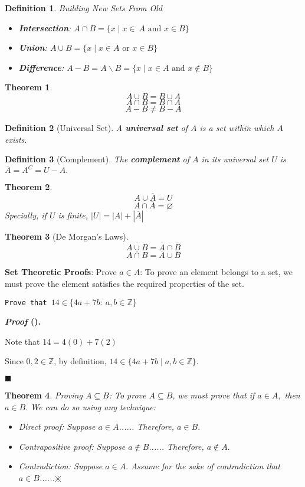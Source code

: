\documentclass[12pt,a4paper]{article}
\newtheorem{thm}{Theorem}[subsection]
\newtheorem{df}{Definition}[subsection]
\newcounter{nprf}[subsection]
\newenvironment*{prf}{\par\indent\textbf{\textit{Proof} (\stepcounter{nprf}\thenprf). }\par}{\par\hfill $\blacksquare$\par}
\def\Z{{\mathbb{Z}}}
\def\emptyset{\varnothing}
\begin{document}
\begin{df}
	Building New Sets From Old
	\begin{itemize}
		\item \textbf{Intersection}: $A\cap B=\{x\mid x\in\ A\text{ and }x\in B\}$
		\item \textbf{Union}: $A\cup B=\{x\mid x\in A\text{ or }x\in B\}$
		\item \textbf{Difference}: $A-B=A\backslash B=\{x\mid x\in A\text{ and }x\notin B\}$
	\end{itemize}
\end{df}
\begin{thm}
	\[A\cup B=B\cup A\]	
	\[A\cap B=B\cap A\]
	\[A-B\neq B-A\]
\end{thm}
\begin{df}[Universal Set]
	A \textbf{universal set} of $A$ is a set within which $A$ exists.	
\end{df}
\begin{df}[Complement]
	The \textbf{complement} of $A$ in its universal set $U$ is $\overline{A}=A^{C}=U-A.$	
\end{df}
\begin{thm}
	\[A\cup\overline{A}=U\]
	\[A\cap\overline{A}=\emptyset\]	
	Specially, if $U$ is finite, $|U|=|A|+|\overline{A}|$
\end{thm}
\begin{thm}[De Morgan's Laws]
	\[\overline{A\cup B}=\overline{A}\cap\overline{B}\]	
	\[\overline{A\cap B}=\overline{A}\cup\overline{B}\]
\end{thm}
\textbf{Set Theoretic Proofs}: Prove $a\in A$: To prove an element belongs to a set, we must prove the element satisfies the required properties of the set. 
\begin{framed}
\noindent\texttt{Prove that $14\in\{4a+7b:\ a,b\in\Z\}$}	
\begin{prf}
	Note that $14=4(0)+7(2)$\par Since $0,2\in\Z$, by definition, $14\in\{4a+7b\mid a,b\in\Z\}.$
\end{prf}
\end{framed}
\begin{thm}
	Proving $A\subseteq B$: To prove $A\subseteq B$, we must prove that if $a\in A,$ then $a\in B.$ We can do so using any technique:
	\begin{itemize}
		\item Direct proof: Suppose $a\in A$...... Therefore, $a\in B.$
		\item Contrapositive proof: Suppose $a\notin B$...... Therefore, $a\notin A.$
		\item Contradiction: Suppose $a\in A.$ Assume for the sake of contradiction that $a\in B$......$\divideontimes$
	\end{itemize}	
\end{thm}
\end{document}
